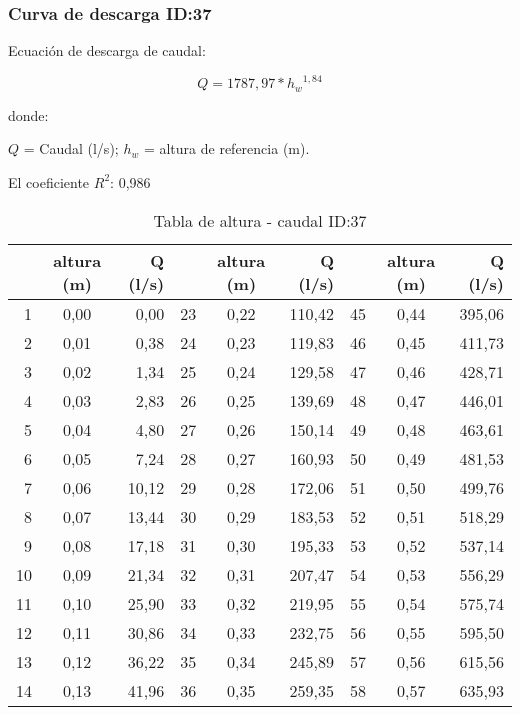 \documentclass[]{article}
\begin{document}
\clearpage

\subsubsection{Curva de descarga ID:37}\label{ID:37}

Ecuación de descarga de caudal:

\[Q = 1787,97*{h_w}^{1,84}\]

donde:

\(Q\) = Caudal (l/s); \(h_w\) = altura de referencia (m).

El coeficiente \(R^2\): 0,986


\begin{table}[H]

\caption{Tabla de altura - caudal ID:37}
\centering

\begin{center}
\begingroup\fontsize{10pt}{11pt}\selectfont
\begin{tabular}{rcrrcrrcr}
  \hline
 & altura (m) & Q (l/s) &  & altura (m) & Q (l/s) &  & altura (m) & Q (l/s) \\ 
  \hline
  1 & 0,00 & 0,00 &  23 & 0,22 & 110,42 &  45 & 0,44 & 395,06 \\ 
    2 & 0,01 & 0,38 &  24 & 0,23 & 119,83 &  46 & 0,45 & 411,73 \\ 
    3 & 0,02 & 1,34 &  25 & 0,24 & 129,58 &  47 & 0,46 & 428,71 \\ 
    4 & 0,03 & 2,83 &  26 & 0,25 & 139,69 &  48 & 0,47 & 446,01 \\ 
    5 & 0,04 & 4,80 &  27 & 0,26 & 150,14 &  49 & 0,48 & 463,61 \\ 
    6 & 0,05 & 7,24 &  28 & 0,27 & 160,93 &  50 & 0,49 & 481,53 \\ 
    7 & 0,06 & 10,12 &  29 & 0,28 & 172,06 &  51 & 0,50 & 499,76 \\ 
    8 & 0,07 & 13,44 &  30 & 0,29 & 183,53 &  52 & 0,51 & 518,29 \\ 
    9 & 0,08 & 17,18 &  31 & 0,30 & 195,33 &  53 & 0,52 & 537,14 \\ 
   10 & 0,09 & 21,34 &  32 & 0,31 & 207,47 &  54 & 0,53 & 556,29 \\ 
   11 & 0,10 & 25,90 &  33 & 0,32 & 219,95 &  55 & 0,54 & 575,74 \\ 
   12 & 0,11 & 30,86 &  34 & 0,33 & 232,75 &  56 & 0,55 & 595,50 \\ 
   13 & 0,12 & 36,22 &  35 & 0,34 & 245,89 &  57 & 0,56 & 615,56 \\ 
   14 & 0,13 & 41,96 &  36 & 0,35 & 259,35 &  58 & 0,57 & 635,93 \\ 

\end{tabular}
\end{center}
\end{table}
\end{document}
